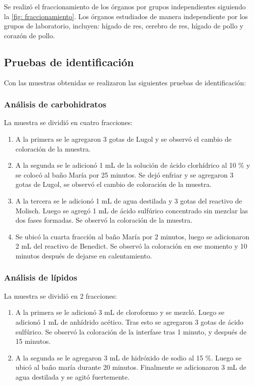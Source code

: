 \documentclass[fleqn,10pt]{SelfArx}
\begin{document}
		Se realizó el fraccionamiento de los órganos por grupos independientes siguiendo la \autoref{fig: fraccionamiento}. Los órganos estudiados de manera independiente por los grupos de laboratorio, incluyen: hígado de res, cerebro de res, hígado de pollo y corazón de pollo.
		
	\subsection{Pruebas de identificación}
		Con las muestras obtenidas se realizaron las siguientes pruebas de identificación:
		\subsubsection{Análisis de carbohidratos}
			La muestra se dividió en cuatro fracciones:
			\begin{enumerate}
				\item A la primera se le agregaron 3 gotas de Lugol y se observó el cambio de coloración de la muestra.
				\item A la segunda se le adicionó 1 mL de la solución de ácido clorhídrico al 10 \% y se colocó al baño María por 25 minutos. Se dejó enfriar y se agregaron 3 gotas de Lugol, se observó el cambio de coloración de la muestra.
				\item A la tercera se le adicionó 1 mL de agua destilada y 3 gotas del reactivo de Molisch. Luego se agregó 1 mL de ácido sulfúrico concentrado sin mezclar las dos fases formadas. Se observó la coloración de la muestra.
				\item Se ubicó la cuarta fracción al baño María por 2 minutos, luego se adicionaron 2 mL del reactivo de Benedict. Se observó la coloración en ese momento y 10 minutos después de dejarse en calentamiento. 
			\end{enumerate}
		\subsubsection{Análisis de lípidos}
			La muestra se dividió en 2 fracciones:
			\begin{enumerate}
				\item A la primera se le adicionó 3 mL de cloroformo y se mezcló. Luego se adicionó 1 mL de anhídrido acético. Tras esto se agregaron 3 gotas de ácido sulfúrico. Se observó la coloración de la interfase tras 1 minuto, y después de 15 minutos.
				\item A la segunda se le agregaron 3 mL de hidróxido de sodio al 15 \%. Luego se ubicó al baño maría durante 20 minutos. Finalmente se adicionaron 3 mL de agua destilada y se agitó fuertemente. 
			\end{enumerate}
		
\end{document}
